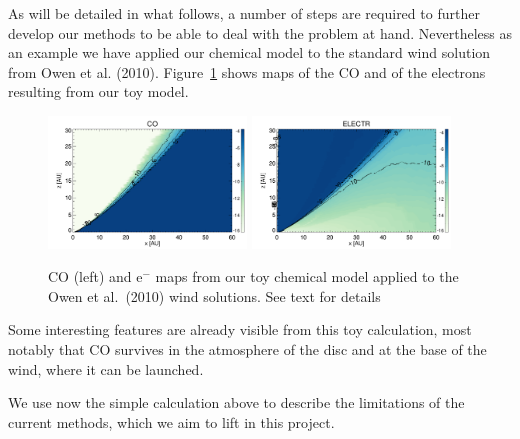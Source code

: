 \documentclass[10pt,fleqn,twoside]{article}
\begin{document}
As will be detailed in what follows, a number of steps are required to
further develop our methods to be able to deal with the problem at
hand. Nevertheless as an example we have applied our chemical model to
the standard wind solution from Owen et
al. (2010). Figure~\ref{fig:chem} shows maps of the CO and of the
electrons resulting from our toy model. 

 \begin{figure}
   \centering
   \includegraphics[width=0.47\textwidth]{Lx_2e29_CO.pdf}
   \includegraphics[width=0.47\textwidth]{Lx_2e29_ELECTR.pdf}
   \caption{CO (left) and e$^-$ maps from our toy chemical model
     applied to the Owen et al.\ (2010) wind solutions. See text for details
}
              \label{fig:chem}%
    \end{figure}

Some interesting features are already visible from this toy
calculation, most notably that CO survives in the atmosphere of the
disc and at the base of the wind, where it can be launched. 

We use now the simple calculation above to describe the limitations of
the current methods, which we aim to lift in this project. 
\end{document}
